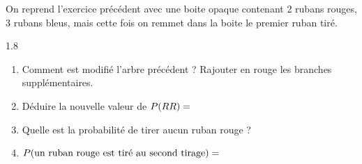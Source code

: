 \documentclass[main.tex]{subfiles}
\begin{document}
\begin{exercise} On reprend l'exercice précédent avec une boite opaque contenant 2 rubans rouges, 3 rubans bleus, mais cette fois on remmet dans la boite le premier ruban tiré. 
	\vspace{-0.5em}
	\begin{spacing}{1.8}
\begin{enumerate}[label=\arabic*), leftmargin=*]
	\item Comment est modifié l'arbre précédent ? Rajouter en rouge les branches supplémentaires.
	\item Déduire la nouvelle valeur de $P(RR)=\dotfill$
	\item Quelle est la probabilité de tirer aucun ruban rouge ?\dotfill 
	\item $P(\text{un ruban rouge est tiré au second tirage})=\dotfill$
\end{enumerate}
\end{spacing}
\vspace{-1.0em}
\end{exercise} 
%	 
\newpage 
\end{document}
